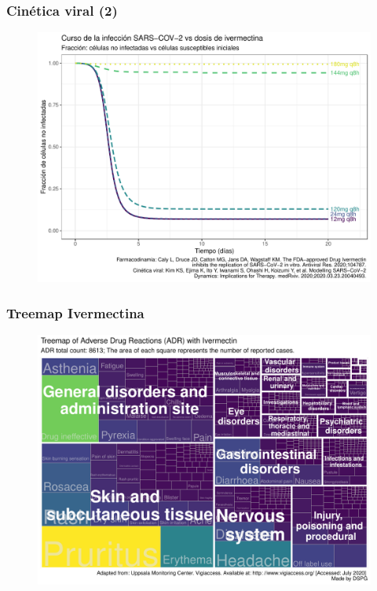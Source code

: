\documentclass[12pt]{beamer}
\begin{document}
	\begin{frame}	
		\frametitle{Cinética viral (2)}	
		\begin{figure}
			\centering
			\includegraphics[width=0.9\linewidth]{../modelo_PD_2/figuras/G4}
			\label{fig:g1}
		\end{figure}
	\end{frame}
	
	\begin{frame}
		\frametitle[Mapa IVM]{Treemap Ivermectina}
		\begin{figure}[t]
			\centering
			\includegraphics[width=0.8\linewidth]{../seguridad_IVM/Heat_Map_IVM}
			\label{fig:heatmapivm}
		\end{figure}
	\end{frame}
\end{document}
